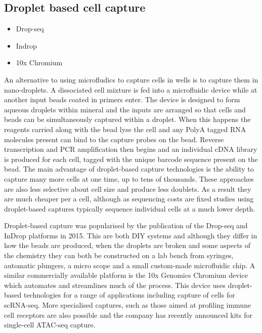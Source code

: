 \documentclass[11pt,a4paper,titlepage,twoside,openright]{style/unimelbthesis}
\theoremstyle{definition}
\theoremstyle{definition}
\theoremstyle{definition}
\theoremstyle{remark}
\begin{document}
\begin{mainmatter}
\hypertarget{droplet-based-cell-capture}{%
\subsection{Droplet based cell capture}\label{droplet-based-cell-capture}}

\begin{itemize}
\tightlist
\item
  Drop-seq
\item
  Indrop
\item
  10x Chromium
\end{itemize}

An alternative to using microfludics to capture cells in wells is to capture them in nano-droplets. A dissociated cell mixture is fed into a microfluidic device while at another input beads coated in primers enter. The device is designed to form aqueous droplets within mineral and the inputs are arranged so that cells and beads can be simultaneously captured within a droplet. When this happens the reagents carried along with the bead lyse the cell and any PolyA tagged RNA molecules present can bind to the capture probes on the bead. Reverse transcription and PCR amplification then begins and an individual cDNA library is produced for each cell, tagged with the unique barcode sequence present on the bead. The main advantage of droplet-based capture technologies is the ability to capture many more cells at one time, up to tens of thousands. These approaches are also less selective about cell size and produce less doublets. As a result they are much cheaper per a cell, although as sequencing costs are fixed studies using droplet-based captures typically sequence individual cells at a much lower depth.

Droplet-based capture was popularised by the publication of the Drop-seq and InDrop platforms in 2015. This are both DIY systems and although they differ in how the beads are produced, when the droplets are broken and some aspects of the chemistry they can both be constructed on a lab bench from syringes, automatic plungers, a micro scope and a small custom-made microfluidic chip. A similar commercially available platform is the 10x Genomics Chromium device which automates and streamlines much of the process. This device uses droplet-based technologies for a range of applications including capture of cells for scRNA-seq. More specialised captures, such as those aimed at profiling immune cell receptors are also possible and the company has recently announced kits for single-cell ATAC-seq capture.


\end{mainmatter}
\end{document}
